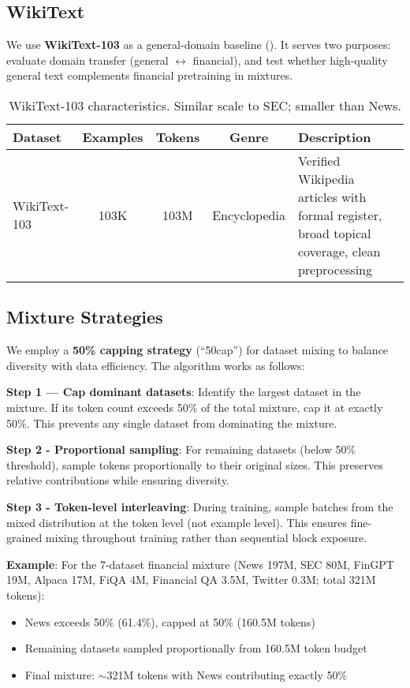 \subsection{WikiText}

We use \textbf{WikiText-103} \parencite{merity2016pointer} as a general-domain baseline (). It serves two purposes: evaluate domain transfer (general $\leftrightarrow$ financial), and test whether high-quality general text complements financial pretraining in mixtures.

\begin{table}[h]
\centering
\caption[WikiText Dataset Characteristics]{WikiText-103 characteristics. Similar scale to SEC; smaller than News.}
\label{tab:wikitext_dataset}
\small
\begin{tabular}{p{3cm}cccp{5.5cm}}
\toprule
\textbf{Dataset} & \textbf{Examples} & \textbf{Tokens} & \textbf{Genre} & \textbf{Description} \\
\midrule
WikiText-103 & 103K & 103M & Encyclopedia & Verified Wikipedia articles with formal register, broad topical coverage, clean preprocessing \\
\bottomrule
\end{tabular}
\end{table}

\subsection{Mixture Strategies}

We employ a \textbf{50\% capping strategy} (``50cap'') for dataset mixing to balance diversity with data efficiency. The algorithm works as follows:

\textbf{Step 1 — Cap dominant datasets}: Identify the largest dataset in the mixture. If its token count exceeds 50\% of the total mixture, cap it at exactly 50\%. This prevents any single dataset from dominating the mixture.

\textbf{Step 2 - Proportional sampling}: For remaining datasets (below 50\% threshold), sample tokens proportionally to their original sizes. This preserves relative contributions while ensuring diversity.

\textbf{Step 3 - Token-level interleaving}: During training, sample batches from the mixed distribution at the token level (not example level). This ensures fine-grained mixing throughout training rather than sequential block exposure.

\textbf{Example}: For the 7-dataset financial mixture (News 197M, SEC 80M, FinGPT 19M, Alpaca 17M, FiQA 4M, Financial QA 3.5M, Twitter 0.3M; total 321M tokens):
\begin{itemize}
\item News exceeds 50\% (61.4\%), capped at 50\% (160.5M tokens)
\item Remaining datasets sampled proportionally from 160.5M token budget
\item Final mixture: $\sim$321M tokens with News contributing exactly 50\%
\end{itemize}

